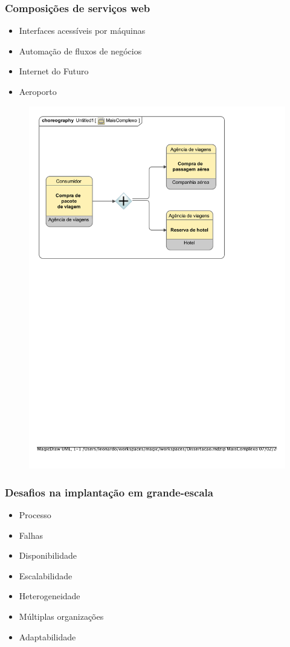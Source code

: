\documentclass{beamer}
\begin{document}
\begin{frame}
\frametitle{Composições de serviços web}

\begin{itemize}
\item Interfaces acessíveis por máquinas
\item Automação de fluxos de negócios
\item Internet do Futuro
\item Aeroporto
\end{itemize}

\begin{figure}
\includegraphics[width=0.7\linewidth]{img/bpmn2}
\end{figure}


\end{frame}


\begin{frame}
\frametitle{Desafios na implantação em grande-escala}

\begin{itemize}
\item Processo
\item Falhas
\item Disponibilidade
\item Escalabilidade
\item Heterogeneidade
\item Múltiplas organizações
\item Adaptabilidade
\end{itemize}

\end{frame}
\end{document}
